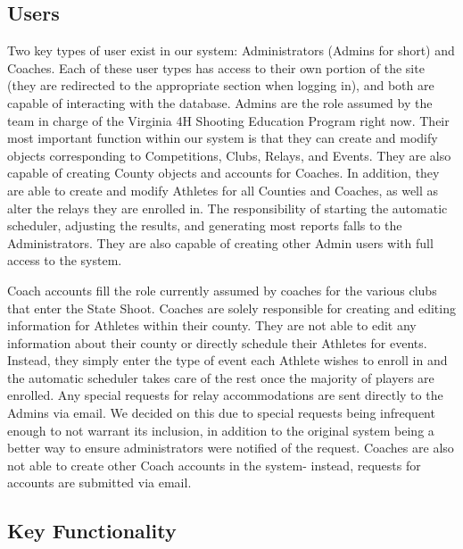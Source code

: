 \documentclass[sigconf]{acmart}
\begin{document}
\subsection{Users}%

Two key types of user exist in our system: Administrators (Admins for short) and Coaches. Each of these user types has access to their own portion of the site (they are redirected to the appropriate section when logging in), and both are capable of interacting with the database.  Admins are the role assumed by the team in charge of the Virginia 4H Shooting Education Program right now. Their most important function within our system is that they can create and modify objects corresponding to Competitions, Clubs, Relays, and Events. They are also capable of creating County objects and accounts for Coaches. In addition, they are able to create and modify Athletes for all Counties and Coaches, as well as alter the relays they are enrolled in. The responsibility of starting the automatic scheduler, adjusting the results, and generating most reports falls to the Administrators. They are also capable of creating other Admin users with full access to the system.

Coach accounts fill the role currently assumed by coaches for the various clubs that enter the State Shoot. Coaches are solely responsible for creating and editing information for Athletes within their county. They are not able to edit any information about their county or directly schedule their Athletes for events. Instead, they simply enter the type of event each Athlete wishes to enroll in and the automatic scheduler takes care of the rest once the majority of players are enrolled. Any special requests for relay accommodations are sent directly to the Admins via email. We decided on this due to special requests being infrequent enough to not warrant its inclusion, in addition to the original system being a better way to ensure administrators were notified of the request. Coaches are also not able to create other Coach accounts in the system- instead, requests for accounts are submitted via email.


\subsection{Key Functionality}
\end{document}
